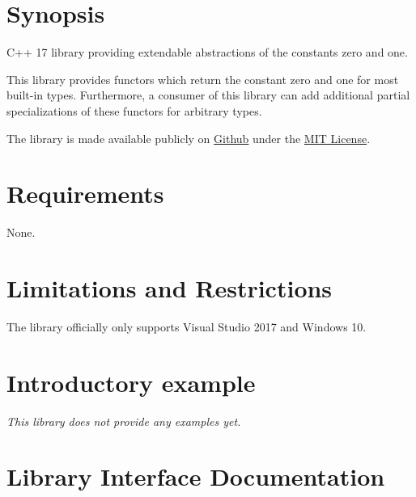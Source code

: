 \documentclass[oneside]{book}
\begin{document}
\frontmatter

\begin{titlepage}
\maketitle
\end{titlepage}

\tableofcontents
{}

\mainmatter

\chapter{Synopsis}
C++ 17 library providing extendable abstractions of the constants zero and one.\newline

\noindent{}This library provides functors which return the constant zero and one for most built-in types.
Furthermore, a consumer of this library can add additional partial specializations of these functors for arbitrary types.\newline

\noindent{}The library is made available publicly on
\href{\GetLibraryRepository}{Github}
under the
\href{\GetLibraryRepository/blob/master/LICENSE}{MIT License}.

\chapter{Requirements}
None.

\chapter{Limitations and Restrictions}
The library officially only supports Visual Studio 2017 and Windows 10.

\chapter{Introductory example}
\textit{\color{orange}This library does not provide any examples yet.}



\chapter{Library Interface Documentation}
\end{document}
